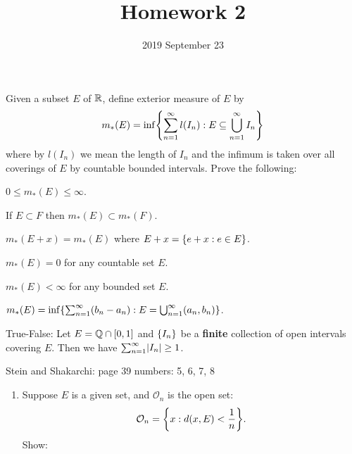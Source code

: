 \documentclass{../homework}
\title{Homework 2}
\author{}
\date{2019 September 23}
\begin{document}
\begin{problems}
\item Given a subset \(E\) of \(\mathbb R\), define exterior measure of
  \(E\) by
  \[
    m_*(E) = \inf\set*{
      \sum_{n=1}^\infty l(I_n)
      : E \subseteq \bigcup_{n=1}^\infty I_n
    }
  \]
  where by \(l(I_n)\) we mean the length of \(I_n\) and the infimum is
  taken over all coverings of \(E\) by countable bounded intervals.
  Prove the following:
  \begin{problems}
  \item \(0 \le m_*(E) \le \infty\).
  \item If \(E \subset F\) then \(m_*(E) \subset m_*(F)\).
  \item \(m_*(E+x) = m_*(E)\) where \(E+x = \{e+x : e \in E\}\).
  \item \(m_*(E) = 0\) for any countable set \(E\).
  \item \(m_*(E) < \infty\) for any bounded set \(E\).
  \item
    \(m_*(E) = \inf\set*{\sum_{n=1}^\infty (b_n-a_n) : E =
      \bigcup_{n=1}^\infty (a_n, b_n)}\).
  \end{problems}

  \begin{solution}
    \begin{problems}
    \item
    \item
    \item
    \item
    \item
    \item
    \end{problems}
  \end{solution}

\item True-False: Let \(E = \mathbb Q \cap [0, 1]\) and \(\{I_n\}\) be a
  \textbf{finite} collection of open intervals covering \(E\).  Then
  we have \(\sum_{n=1}^\infty \lvert I_n\rvert \ge 1\).

  \begin{solution}
  \end{solution}

\item Stein and Shakarchi: page 39 numbers: 5, 6, 7, 8

  \begin{book}
    \begin{enumerate}[start=5]
    \item Suppose \(E\) is a given set, and \(\mathcal O_n\) is the
      open set:
      \[
        \mathcal O_n = \set*{x : d(x, E) < \frac 1 n}.
      \]
      Show:
    \end{enumerate}
  \end{book}


\end{problems}
\end{document}
